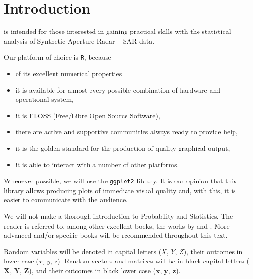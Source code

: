 \chapter{Introduction}\label{Chapter:Introduction}

 is intended for those interested in gaining practical skills with the statistical analysis of Synthetic Aperture Radar -- SAR data.

Our platform of choice is \texttt R, because
\begin{itemize}
\item of its excellent numerical properties\cite{AlmironSilvaMM:2009}%
\cite{OctaveScilabMatlabCAM}
\item it is available for almost every possible combination of hardware and operational system,
\item it is FLOSS (Free/Libre Open Source Software),
\item there are active and supportive communities always ready to provide help,
\item it is the golden standard for the production of quality graphical output,
\item it is able to interact with a number of other platforms.
\end{itemize}

Whenever possible, we will use the \texttt{ggplot2} library\cite{HitchhikerGuideGGPLO2,ggplot2Wickman,DataVisualizationaPracticalIntroduction2019}.
It is our opinion that this library allows producing plots of immediate visual quality and, with this, it is easier to communicate with the audience.

We will not make a thorough introduction to Probability and Statistics.
The reader is referred to, among other excellent books, the works by
\citet{BickelDocksum77} and
\citet{ModernIntroProbStat:Dekkingetal:2005}.
More advanced and/or specific books will be recommended throughout this text.


Random variables will be denoted in capital letters ($X$, $Y$, $Z$),
their outcomes in lower case ($x$, $y$, $z$).
Random vectors and matrices will be in black capital letters ($\bm X$, $\bm Y$, $\bm Z$), and their outcomes in black lower case ($\bm x$, $\bm y$, $\bm z$).


